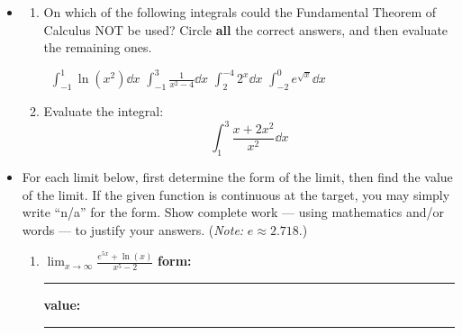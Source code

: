 \documentclass[11pt]{article}
\begin{document}
\begin{itemize}
\begin{center}
\begin{tabular}{l c r l c r}
            $\displaystyle\int 2^x\,dx$ & $=$ & \rule[-8pt]{1.5in}{0.4pt}&
            $\displaystyle\int x^2 + 3x^4\,dx$ & $=$ & \rule[-8pt]{1.5in}{0.4pt}\\[1in]
            $\displaystyle\int x^{-1} \,dx$ & $=$ & \rule[-8pt]{1.5in}{0.4pt} & 
            $\displaystyle\int e^5 \,dx$ & $=$ & \rule[-8pt]{1.5in}{0.4pt}\\[0.3in]
        \end{tabular}
    \end{center}        \pagebreak

\item[\textbf{I4.}] 
    \begin{enumerate}[label=(\alph*)]

        \item On which of the following integrals could the Fundamental Theorem of Calculus NOT be used? Circle \textbf{all} the correct answers, and then evaluate the remaining ones.

            \,\hfill
             $\displaystyle\int_{-1}^1 \ln (x^2)\dd{x}$
            \hfill
             $\displaystyle\int_{-1}^3 \frac1{x^2-4}\dd{x}$
            \hfill
             $\displaystyle\int_{2}^{-4} 2^x\dd{x}$
            \hfill
             $\displaystyle\int_{-2}^{0} e^{\sqrt{x}} \dd{x}$
            \hfill\

            \vspace{5cm}

        \item Evaluate the integral:
            \[
                \int_{1}^3 \frac{x+2x^2}{x^2} \dd{x}
            \]
    \end{enumerate}
    \pagebreak

\item[\textbf{L2.}] For each limit below, first determine the form of the limit, then find the value of the limit. 
    If the given function is continuous at the target, you may simply write ``n/a'' for the form. 
    Show complete work --- using mathematics and/or words --- to justify your answers. 
    ({\it Note:} $e \approx 2.718$.)


    \begin{enumerate}
        \item[(a)] $\displaystyle\lim_{x\to\infty} \frac{e^{5x}+ \ln(x)}{x^{5} - 2}$
            \hspace{1cm}
            \textbf{form:} \rule[-6pt]{1.25in}{0.4pt} \quad
            \textbf{value:} \rule[-6pt]{1.25in}{0.4pt}
            \vspace{5cm}


\end{enumerate}
\end{itemize}
\end{document}
